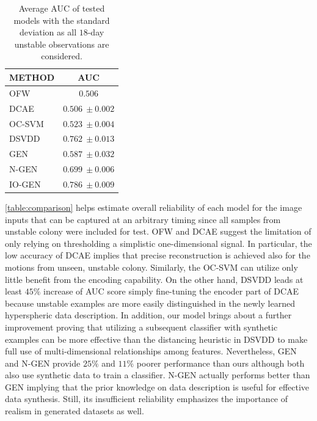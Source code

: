 \documentclass[letterpaper]{article} %
\let\orgautoref\autoref
\providecommand{\Autoref}
{\def\equationautorefname{Equation}%
	\def\figureautorefname{Figure}%
	\def\subfigureautorefname{Figure}%
	\def\Itemautorefname{Item}%
	\def\tableautorefname{Table}%
	\def\exerciseautorefname{Exercise}%
	\def\starexerciseautorefname{Exercise}%
	\def\sectionautorefname{Section}%
	\def\subsectionautorefname{Section}%
	\def\subsubsectionautorefname{Section}%
	\def\chapterautorefname{Section}%
	\def\partautorefname{Part}%
	\orgautoref}
\renewcommand{\autoref}
{\def\equationautorefname{Equation}%
	\def\figureautorefname{Fig.}%
	\def\subfigureautorefname{Fig.}%
	\def\Itemautorefname{item}%
	\def\tableautorefname{Table}%
	\def\exerciseautorefname{Exercise}%
	\def\starexerciseautorefname{Exercise}%
	\def\sectionautorefname{Section}%
	\def\subsectionautorefname{Section}%
	\def\subsubsectionautorefname{Section}%
	\def\chapterautorefname{Section}%
	\def\partautorefname{Part}%
	\orgautoref}
\begin{document}
\setlength{\tabcolsep}{0.5em} %
{\renewcommand{\arraystretch}{1.2}%
	\begin{table}[t]
		\centering
		\begin{tabular}{|p{40mm}c|} %
			\hline
			METHOD & AUC \\ \hline\hline
			OFW & $0.506$ \\ %
			DCAE & $0.506~\pm 0.002$ \\ %
			OC-SVM & $0.523~\pm 0.004$ \\ %
			DSVDD & $0.762~\pm 0.013$ \\ %
			GEN & $0.587~\pm 0.032$ \\ %
			N-GEN & $0.699~\pm 0.006$ \\ \hline\hline
			IO-GEN & $\mathbf{0.786~\pm 0.009}$ \\ \hline
		\end{tabular}
		\caption{Average AUC of tested models with the standard deviation 
		as all $18$-day unstable observations are considered.}
		\label{table:comparison}
	\end{table}
}
%
\Autoref{table:comparison} helps estimate overall reliability of each
model for the image inputs that can be captured at an arbitrary timing
since all samples from unstable colony were included for test. OFW and
DCAE suggest the limitation of only relying on thresholding a simplistic
one-dimensional signal. In particular, the low accuracy of DCAE implies
that precise reconstruction is achieved also for the motions from 
unseen, unstable colony. 
Similarly, the OC-SVM can utilize only little benefit from the
encoding capability. On the other hand, DSVDD leads at least $45\%$
increase of AUC score simply fine-tuning the encoder part of DCAE
because unstable examples are more easily distinguished in the newly
learned hyperspheric data description. In addition, our model brings
about a further improvement proving that utilizing a subsequent
classifier with synthetic examples can be more effective than the
distancing heuristic in DSVDD to make full use of multi-dimensional
relationships among features. Nevertheless, GEN and \mbox{N-GEN} provide $25\%$
and $11\%$ poorer performance than ours although both also use synthetic
data to train a classifier. \mbox{N-GEN} actually performs better than GEN
implying that the prior knowledge on data description is useful for
effective data synthesis. Still, its insufficient reliability emphasizes
the importance of realism in generated datasets as well.
\end{document}

